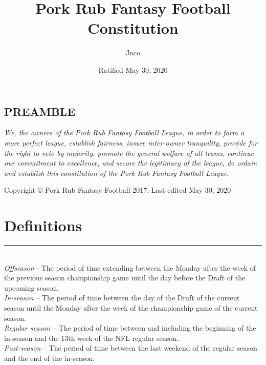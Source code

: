 \documentclass{article}
\title{Pork Rub Fantasy Football Constitution}
\author{Jnco}
\date{Ratified May 30, 2020}
\begin{document}
\begin{titlepage}
    \maketitle
    \thispagestyle{empty}
\end{titlepage}
\begin{center}
    \section{PREAMBLE}
\end{center}
\noindent\textit{We, the owners of the Pork Rub Fantasy Football League, in order to form a more perfect league, establish fairness, insure inter-owner tranquility, provide for the right to veto by majority, promote the general welfare of all teams, continue our commitment to excellence, and secure the legitimacy of the league, do ordain and establish this constitution of the Pork Rub Fantasy Football League.}

\newpage
\begin{center}
    Copyright \copyright{} Pork Rub Fantasy Football 2017. Last edited May 30, 2020
\end{center}

\newpage
\tableofcontents
\newpage

\section{Definitions}

    \noindent\rule{\textwidth}{0.5pt}\\

    \noindent\textit{Offseason} - The period of time extending between the Monday after the week of the previous season championship game until the day before the Draft of the upcoming season.\\

    \noindent\textit{In-season} – The period of time between the day of the Draft of the current season until the Monday after the week of the championship game of the current season.\\
    \noindent\textit{Regular season} – The period of time between and including the beginning of the in-season and the 13th week of the NFL regular season.\\

    \noindent\textit{Post-season} – The period of time between the last weekend of the regular season and the end of the in-season.\\
\end{document}
